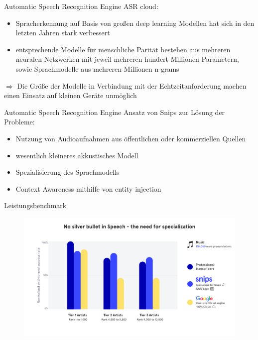\documentclass[aspectratio=169]{beamer}
\begin{document}
\begin{frame}{Automatic Speech Recognition Engine}
	ASR cloud:
	\begin{itemize}
		\item Spracherkennung auf Basis von großen deep learning Modellen hat sich in den letzten Jahren stark verbessert
		\item entsprechende Modelle für menschliche Parität bestehen aus mehreren neuralen Netzwerken mit jeweil mehreren hundert Millionen Parametern, sowie Sprachmodelle aus mehreren Millionen n-grams
	\end{itemize}
	$\Rightarrow$ Die Größe der Modelle in Verbindung mit der Echtzeitanforderung machen einen Einsatz auf kleinen Geräte unmöglich
\end{frame}

\begin{frame}{Automatic Speech Recognition Engine}
	Ansatz von Snips zur Lösung der Probleme:
	\begin{itemize}
		\item Nutzung von Audioaufnahmen aus öffentlichen oder kommerziellen Quellen
		\item wesentlich kleineres akkustisches Modell
		\item Spezialisierung des Sprachmodells
		\item Context Awareness mithilfe von entity injection
	\end{itemize}
\end{frame}

\begin{frame}{Leistungsbenchmark}
	\begin{figure}
		\includegraphics[scale=0.3]{images/benchmark-3}
	\end{figure}
\end{frame}
\end{document}
